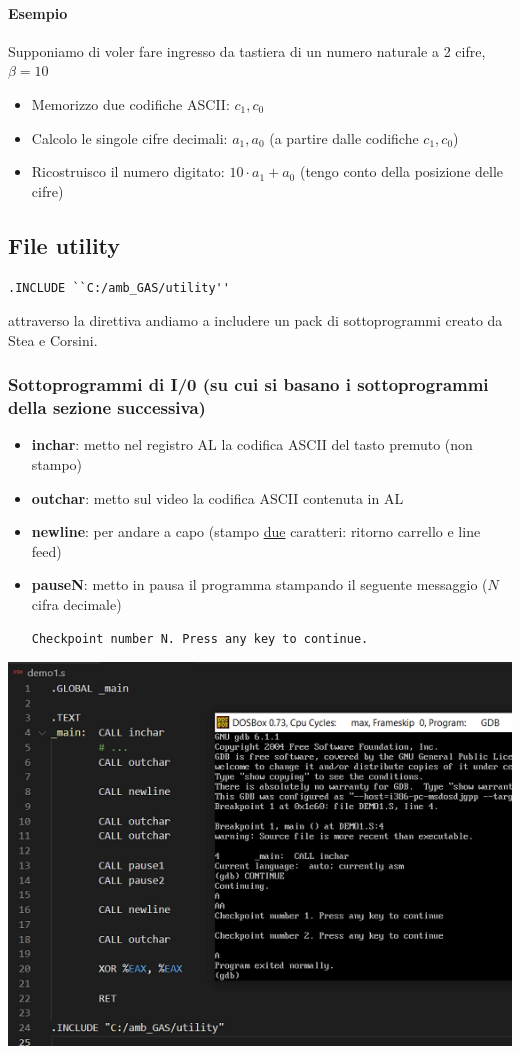 \documentclass[11pt]{report}
\begin{document}
\paragraph{Esempio} Supponiamo di voler fare ingresso da tastiera di un numero naturale a 2 cifre, $\beta=10$
\begin{itemize}
\item Memorizzo due codifiche ASCII: $c_1, c_0$
\item Calcolo le singole cifre decimali: $a_1,a_0$ (a partire dalle codifiche $c_1,c_0$)
\item Ricostruisco il numero digitato: $10\cdot a_1+a_0$ (tengo conto della posizione delle cifre)
\end{itemize}
\subsection{File utility}
\begin{verbatim}
.INCLUDE ``C:/amb_GAS/utility''
\end{verbatim}
attraverso la direttiva andiamo a includere un pack di sottoprogrammi creato da Stea e Corsini.
\subsubsection{Sottoprogrammi di I/0 (su cui si basano i sottoprogrammi della sezione successiva)}
\begin{itemize}
\item \textbf{inchar}: metto nel registro AL la codifica ASCII del tasto premuto (non stampo)
\item \textbf{outchar}: metto sul video la codifica ASCII contenuta in AL
\item \textbf{newline}: per andare a capo (stampo \underline{due} caratteri: ritorno carrello e line feed)
\item \textbf{pauseN}: metto in pausa il programma stampando il seguente messaggio ($N$ cifra decimale)
\begin{verbatim}
Checkpoint number N. Press any key to continue.
\end{verbatim}
\end{itemize}
\begin{center}
\includegraphics{img/218.PNG}
\end{center}
\end{document}
